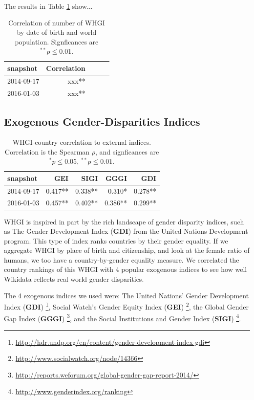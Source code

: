 \documentclass[letterpaper]{article}
\begin{document}
The results in Table \ref{table:worldpop} show...
\begin{table}
\caption{Correlation of number of WHGI by date of birth and world population. Signficances are $ ^{**}p\leq 0.01$.}
\label{table:worldpop}
\begin{tabular}{lrrrr}
\toprule
snapshot &  Correlation \\
\midrule
2014-09-17 & xxx**  \\
2016-01-03 & xxx**  \\
\bottomrule
\end{tabular}
\end{table}

\subsection{Exogenous Gender-Disparities Indices}
\begin{table}
\caption{WHGI-country correlation to external indices. Correlation is the Spearman $\rho$, and signficances are $ ^*p\leq 0.05 $, $ ^{**}p\leq 0.01$.}
\label{table:scores}
\begin{tabular}{lrrrr}
\toprule
snapshot &  GEI &  SIGI &  GGGI &  GDI  \\
\midrule
2014-09-17 &  0.417** &       0.338** &          0.310* &         0.278**  \\
2016-01-03 &  0.457** &       0.402** &          0.386** &         0.299**  \\
\bottomrule
\end{tabular}
\end{table}

WHGI is inspired in part by the rich landscape of gender disparity indices, such as The Gender Development Index (\textbf{GDI}) from the United Nations Development program. This type of index ranks countries by their gender equality. If we aggregate WHGI by place of birth and citizenship, and look at the female ratio of humans, we too have a country-by-gender equality measure.  We correlated the country rankings of this WHGI with 4 popular exogenous indices to see how well Wikidata reflects real world gender disparities. 

The 4 exogenous indices we used were: The United Nations' Gender Development Index (\textbf{GDI})  \footnote{\url{http://hdr.undp.org/en/content/gender-development-index-gdi}},  Social Watch's Gender Equity Index (\textbf{GEI}) \footnote{\url{http://www.socialwatch.org/node/14366}},  the Global Gender Gap Index (\textbf{GGGI}) \footnote{\url{http://reports.weforum.org/global-gender-gap-report-2014/}}, and the Social Institutions and Gender Index (\textbf{SIGI}) \footnote{\url{http://www.genderindex.org/ranking}}. 
\end{document}
